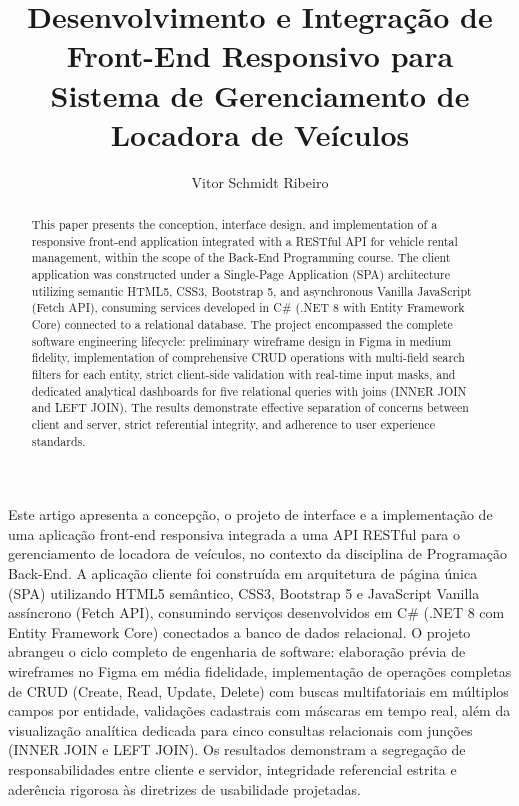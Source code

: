 \documentclass[12pt]{article}
\title{Desenvolvimento e Integração de Front-End Responsivo para Sistema de Gerenciamento de Locadora de Veículos}
\author{Vitor Schmidt Ribeiro\inst{1}}
\begin{document}
\maketitle

\begin{resumo}
Este artigo apresenta a concepção, o projeto de interface e a implementação de uma aplicação front-end responsiva integrada a uma API RESTful para o gerenciamento de locadora de veículos, no contexto da disciplina de Programação Back-End. A aplicação cliente foi construída em arquitetura de página única (SPA) utilizando HTML5 semântico, CSS3, Bootstrap 5 e JavaScript Vanilla assíncrono (Fetch API), consumindo serviços desenvolvidos em C# (.NET 8 com Entity Framework Core) conectados a banco de dados relacional. O projeto abrangeu o ciclo completo de engenharia de software: elaboração prévia de wireframes no Figma em média fidelidade, implementação de operações completas de CRUD (Create, Read, Update, Delete) com buscas multifatoriais em múltiplos campos por entidade, validações cadastrais com máscaras em tempo real, além da visualização analítica dedicada para cinco consultas relacionais com junções (INNER JOIN e LEFT JOIN). Os resultados demonstram a segregação de responsabilidades entre cliente e servidor, integridade referencial estrita e aderência rigorosa às diretrizes de usabilidade projetadas.
\end{resumo}

\begin{abstract}
This paper presents the conception, interface design, and implementation of a responsive front-end application integrated with a RESTful API for vehicle rental management, within the scope of the Back-End Programming course. The client application was constructed under a Single-Page Application (SPA) architecture utilizing semantic HTML5, CSS3, Bootstrap 5, and asynchronous Vanilla JavaScript (Fetch API), consuming services developed in C# (.NET 8 with Entity Framework Core) connected to a relational database. The project encompassed the complete software engineering lifecycle: preliminary wireframe design in Figma in medium fidelity, implementation of comprehensive CRUD operations with multi-field search filters for each entity, strict client-side validation with real-time input masks, and dedicated analytical dashboards for five relational queries with joins (INNER JOIN and LEFT JOIN). The results demonstrate effective separation of concerns between client and server, strict referential integrity, and adherence to user experience standards.
\end{abstract}
\end{document}

